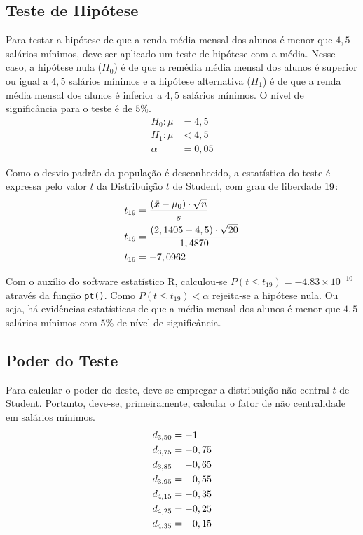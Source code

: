 

\subsection{Teste de Hipótese}

	Para testar a hipótese de que a renda média mensal dos alunos é menor
	que $4,5$ salários mínimos, deve ser aplicado um teste de hipótese com a
	média. Nesse caso, a hipótese nula ($H_0$) é de que a remédia média mensal dos
	alunos é superior ou igual a $4,5$ salários mínimos e a hipótese alternativa
	($H_1$) é de que a renda média mensal dos alunos é inferior a $4,5$ salários
	mínimos. O nível de significância para o teste é de $5\%$.
	\begin{align*}
		H_0: \mu &= 4,5\\
		H_1: \mu &< 4,5   \\
		     \alpha &= 0,05
	\end{align*}

	Como o desvio padrão da população é desconhecido, a estatística do
	teste é expressa pelo valor $t$ da Distribuição $t$ de Student, com grau de
	liberdade $19$:
	\begin{align*}
		t_{19} &= \frac{(\bar{x} - \mu_0)\cdot\sqrt{n}}{s} \\
		t_{19} &= \dfrac{(2,1405 - 4,5) \cdot \sqrt{20}}{1,4870} \\
		t_{19} &= -7,0962
	\end{align*}

	Com o auxílio do software estatístico R, calculou-se $P(t  \leq t_{19})
	= -4.83\times 10^{-10}$ através da função \texttt{pt()}. Como $P(t  \leq
	t_{19}) < \alpha$ rejeita-se a hipótese nula. Ou seja, há evidências
	estatísticas de que a média mensal dos alunos é menor que $4,5$ salários
	mínimos com $5\%$ de nível de significância.

\subsection{Poder do Teste}

	Para calcular o poder do deste, deve-se empregar a distribuição não
	central $t$ de Student. Portanto, deve-se, primeiramente, calcular o fator de
	não centralidade em salários mínimos.
	\begin{align*}
		d_{3,50} &= -1\\
		d_{3,75} &= -0,75\\
		d_{3,85} &= -0,65\\
		d_{3,95} &= -0,55\\
		d_{4,15} &= -0,35\\
		d_{4,25} &= -0,25\\
		d_{4,35} &= -0,15\\
	\end{align*}

